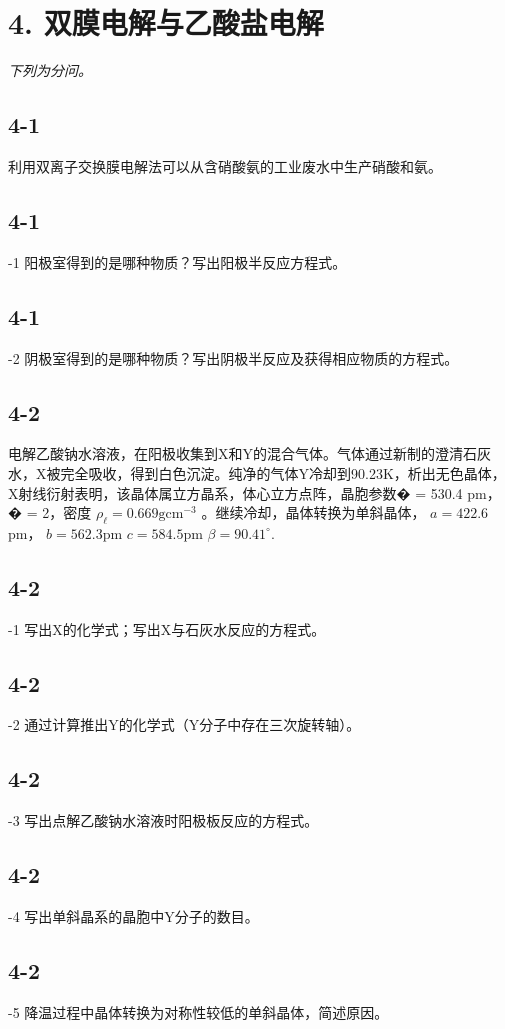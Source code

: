 \section*{4. 双膜电解与乙酸盐电解}
\textit{下列为分问。}

\subsection*{4-1}
利⽤双离⼦交换膜电解法可以从含硝酸氨的⼯业废⽔中⽣产硝酸和氨。

\subsection*{4-1}
-1 阳极室得到的是哪种物质？写出阳极半反应⽅程式。

\subsection*{4-1}
-2 阴极室得到的是哪种物质？写出阴极半反应及获得相应物质的⽅程式。

\subsection*{4-2}
电解⼄酸钠⽔溶液，在阳极收集到X和Y的混合⽓体。⽓体通过新制的澄清⽯灰⽔，X被完全吸收，得到⽩⾊沉淀。纯净的⽓体Y冷却到90.23K，析出⽆⾊晶体，X射线衍射表明，该晶体属⽴⽅晶系，体⼼⽴⽅点阵，晶胞参数� = 530.4 pm，� = 2，密度 $\rho _ { \mathrm { \ell } } = 0 . 6 6 9 \mathrm { g c m ^ { - 3 } }$ 。继续冷却，晶体转换为单斜晶体， $a = 4 2 2 . 6$ pm， $b = 5 6 2 . 3 \mathrm { p m }$ $c = 5 8 4 . 5 \mathrm { p m }$ $\beta = 9 0 . 4 1 ^ { \circ } .$

\subsection*{4-2}
-1 写出X的化学式；写出X与⽯灰⽔反应的⽅程式。

\subsection*{4-2}
-2 通过计算推出Y的化学式（Y分⼦中存在三次旋转轴）。

\subsection*{4-2}
-3 写出点解⼄酸钠⽔溶液时阳极板反应的⽅程式。

\subsection*{4-2}
-4 写出单斜晶系的晶胞中Y分⼦的数⽬。

\subsection*{4-2}
-5 降温过程中晶体转换为对称性较低的单斜晶体，简述原因。
